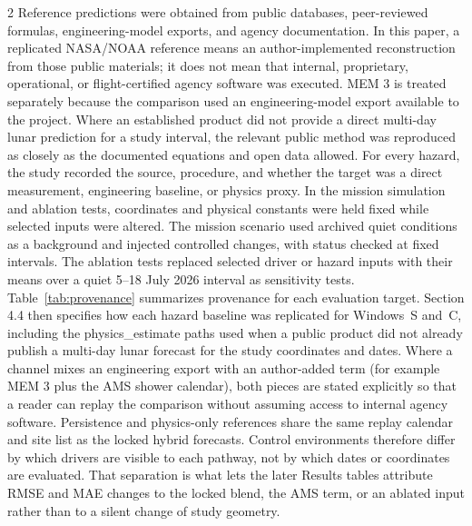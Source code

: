 \begin{multicols}{2}
Reference predictions were obtained from public databases, peer-reviewed formulas, engineering-model exports, and agency documentation. In this paper, a replicated NASA/NOAA reference means an author-implemented reconstruction from those public materials; it does not mean that internal, proprietary, operational, or flight-certified agency software was executed. MEM 3 is treated separately because the comparison used an engineering-model export available to the project. Where an established product did not provide a direct multi-day lunar prediction for a study interval, the relevant public method was reproduced as closely as the documented equations and open data allowed. For every hazard, the study recorded the source, procedure, and whether the target was a direct measurement, engineering baseline, or physics proxy. In the mission simulation and ablation tests, coordinates and physical constants were held fixed while selected inputs were altered. The mission scenario used archived quiet conditions as a background and injected controlled changes, with status checked at fixed intervals. The ablation tests replaced selected driver or hazard inputs with their means over a quiet 5--18 July 2026 interval as sensitivity tests. Table~\ref{tab:provenance} summarizes provenance for each evaluation target. Section 4.4 then specifies how each hazard baseline was replicated for Windows~S and~C, including the physics\_estimate paths used when a public product did not already publish a multi-day lunar forecast for the study coordinates and dates. Where a channel mixes an engineering export with an author-added term (for example MEM 3 plus the AMS shower calendar), both pieces are stated explicitly so that a reader can replay the comparison without assuming access to internal agency software. Persistence and physics-only references share the same replay calendar and site list as the locked hybrid forecasts. Control environments therefore differ by which drivers are visible to each pathway, not by which dates or coordinates are evaluated. That separation is what lets the later Results tables attribute RMSE and MAE changes to the locked blend, the AMS term, or an ablated input rather than to a silent change of study geometry.
\end{multicols}

